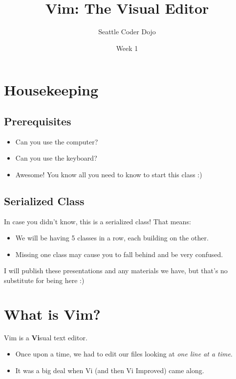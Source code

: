 \documentclass[aspectratio=1610]{beamer}                  %
\title{Vim: The Visual Editor}			%
\author{Seattle Coder Dojo}
\date{Week 1}							%
\newcommand{\srule}{
	\rule{\textwidth}{1pt}\\
}
\newlength{\subsecwidth}
\newenvironment{slide}{
	\begin{frame}                                    %
		\settowidth{\subsecwidth}{\insertsubsection} %
		\ifthenelse{\dimtest{\subsecwidth}{<}{1pt}}{ %
			\frametitle{\huge \insertsection\\             %
				\vspace{-1ex}                            %
			}
		}{                                           %
			\frametitle{\huge \insertsection\ -- \insertsubsection\\ %
				\vspace{-1ex}                            %
			}
		}
		\Large                                       %
	}{
	\end{frame}
}
\begin{document}

\begin{frame}                           %
	\titlepage                          %
\end{frame}

\section{Housekeeping}
\subsection{Prerequisites}
\begin{slide}
    \begin{itemize}
        \item Can you use the computer?
        \item Can you use the keyboard?

            \pause
        \item Awesome! You know all you need to know to start this class :)
    \end{itemize}
\end{slide}

\subsection{Serialized Class}
\begin{slide}
    In case you didn't know, this is a serialized class! That means:
    \begin{itemize}
        \item We will be having 5 classes in a row, each building on the other.
        \item Missing one class may cause you to fall behind and be very confused.
    \end{itemize}
    I will publish these presentations and any materials we have, but that's no
    substitute for being here :)
\end{slide}

\section{What is Vim?}
\begin{slide}
    Vim is a \textbf{Vi}sual text editor.
	\begin{itemize}
        \item Once upon a time, we had to edit our files looking at \textit{one line at a time}.
        \item It was a big deal when Vi (and then Vi Improved) came along.
	\end{itemize}
\end{slide}
\end{document}
